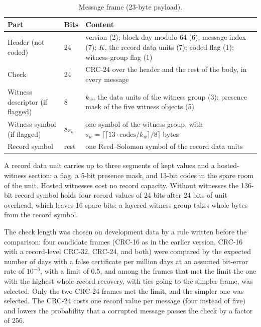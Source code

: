 \begin{table}[t]
\centering
\caption{Message frame (23-byte payload).}
\label{tab:frame}
\small
\begin{tabularx}{\textwidth}{@{}llX@{}}
\toprule
Part & Bits & Content \\
\midrule
Header (not coded) & 24 & version (2); block day modulo 64 (6); message index (7); $K$, the record data units (7); coded flag (1); witness-group flag (1) \\
Check & 24 & CRC-24 over the header and the rest of the body, in every message \\
Witness descriptor (if flagged) & 8 & $k_w$, the data units of the witness group (3); presence mask of the five witness objects (5) \\
Witness symbol (if flagged) & $8 s_w$ & one symbol of the witness group, with $s_w = \lceil \lceil 13 \cdot \text{codes} / k_w \rceil / 8 \rceil$ bytes \\
Record symbol & rest & one Reed--Solomon symbol of the record data units \\
\bottomrule
\end{tabularx}
\end{table}

A record data unit carries up to three segments of kept values and a hosted-witness section: a flag, a 5-bit presence mask, and 13-bit codes in the spare room of the unit. Hosted witnesses cost no record capacity. Without witnesses the 136-bit record symbol holds four record values of 24 bits after 24 bits of unit overhead, which leaves 16 spare bits; a layered witness group takes whole bytes from the record symbol.

The check length was chosen on development data by a rule written before the comparison: four candidate frames (CRC-16 as in the earlier version, CRC-16 with a record-level CRC-32, CRC-24, and both) were compared by the expected number of days with a false certificate per million days at an assumed bit-error rate of $10^{-3}$, with a limit of 0.5, and among the frames that met the limit the one with the highest whole-record recovery, with ties going to the simpler frame, was selected. Only the two CRC-24 frames met the limit, and the simpler one was selected. The CRC-24 costs one record value per message (four instead of five) and lowers the probability that a corrupted message passes the check by a factor of 256.


